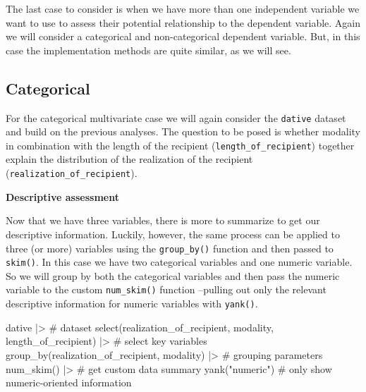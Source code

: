 \documentclass[
  letterpaper,
]{latex/krantz}
\newenvironment{Shaded}{\begin{snugshade}}{\end{snugshade}}
\newcommand{\CommentTok}[1]{\textcolor[rgb]{0.37,0.37,0.37}{#1}}
\newcommand{\FunctionTok}[1]{\textcolor[rgb]{0.28,0.35,0.67}{#1}}
\newcommand{\NormalTok}[1]{\textcolor[rgb]{0.00,0.23,0.31}{#1}}
\newcommand{\SpecialCharTok}[1]{\textcolor[rgb]{0.37,0.37,0.37}{#1}}
\newcommand{\StringTok}[1]{\textcolor[rgb]{0.13,0.47,0.30}{#1}}
\begin{document}
The last case to consider is when we have more than one independent
variable we want to use to assess their potential relationship to the
dependent variable. Again we will consider a categorical and
non-categorical dependent variable. But, in this case the implementation
methods are quite similar, as we will see.

\hypertarget{categorical-2}{%
\subsection{Categorical}\label{categorical-2}}

For the categorical multivariate case we will again consider the
\texttt{dative} dataset and build on the previous analyses. The question
to be posed is whether modality in combination with the length of the
recipient (\texttt{length\_of\_recipient}) together explain the
distribution of the realization of the recipient
(\texttt{realization\_of\_recipient}).

\textbf{Descriptive assessment}

Now that we have three variables, there is more to summarize to get our
descriptive information. Luckily, however, the same process can be
applied to three (or more) variables using the \texttt{group\_by()}
function and then passed to \texttt{skim()}. In this case we have two
categorical variables and one numeric variable. So we will group by both
the categorical variables and then pass the numeric variable to the
custom \texttt{num\_skim()} function --pulling out only the relevant
descriptive information for numeric variables with \texttt{yank()}.

\begin{Shaded}
\begin{Highlighting}[]
\NormalTok{dative }\SpecialCharTok{|\textgreater{}} \CommentTok{\# dataset}
  \FunctionTok{select}\NormalTok{(realization\_of\_recipient, modality, length\_of\_recipient) }\SpecialCharTok{|\textgreater{}} \CommentTok{\# select key variables}
  \FunctionTok{group\_by}\NormalTok{(realization\_of\_recipient, modality) }\SpecialCharTok{|\textgreater{}} \CommentTok{\# grouping parameters}
  \FunctionTok{num\_skim}\NormalTok{() }\SpecialCharTok{|\textgreater{}} \CommentTok{\# get custom data summary}
  \FunctionTok{yank}\NormalTok{(}\StringTok{"numeric"}\NormalTok{) }\CommentTok{\# only show numeric{-}oriented information}
\end{Highlighting}
\end{Shaded}
\end{document}
